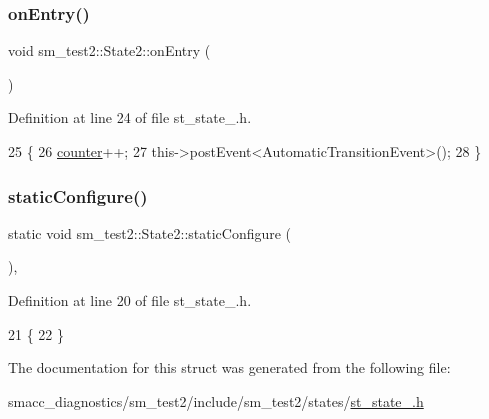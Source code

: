 \subsubsection{\texorpdfstring{on\+Entry()}{onEntry()}}
{\footnotesize\ttfamily void sm\+\_\+test2\+::\+State2\+::on\+Entry (\begin{DoxyParamCaption}{ }\end{DoxyParamCaption})\hspace{0.3cm}{\ttfamily [inline]}}



Definition at line 24 of file st\+\_\+state\+\_.\+h.


\begin{DoxyCode}
25     \{
26         \hyperlink{namespacesm__test2_a42c85e52b584387fd269df67f8e6c732}{counter}++;
27         this->postEvent<AutomaticTransitionEvent>();
28     \}
\end{DoxyCode}
\mbox{\label{structsm__test2_1_1State2_a0bbdc8382042af7edd85a3c048ad7c7c}} 
\subsubsection{\texorpdfstring{static\+Configure()}{staticConfigure()}}
{\footnotesize\ttfamily static void sm\+\_\+test2\+::\+State2\+::static\+Configure (\begin{DoxyParamCaption}{ }\end{DoxyParamCaption})\hspace{0.3cm}{\ttfamily [inline]}, {\ttfamily [static]}}



Definition at line 20 of file st\+\_\+state\+\_.\+h.


\begin{DoxyCode}
21     \{
22     \}
\end{DoxyCode}


The documentation for this struct was generated from the following file\+:\begin{DoxyCompactItemize}
\item 
smacc\+\_\+diagnostics/sm\+\_\+test2/include/sm\+\_\+test2/states/\hyperlink{smacc__diagnostics_2sm__test2_2include_2sm__test2_2states_2st__state__2_8h}{st\+\_\+state\+\_.\+h}\end{DoxyCompactItemize}

